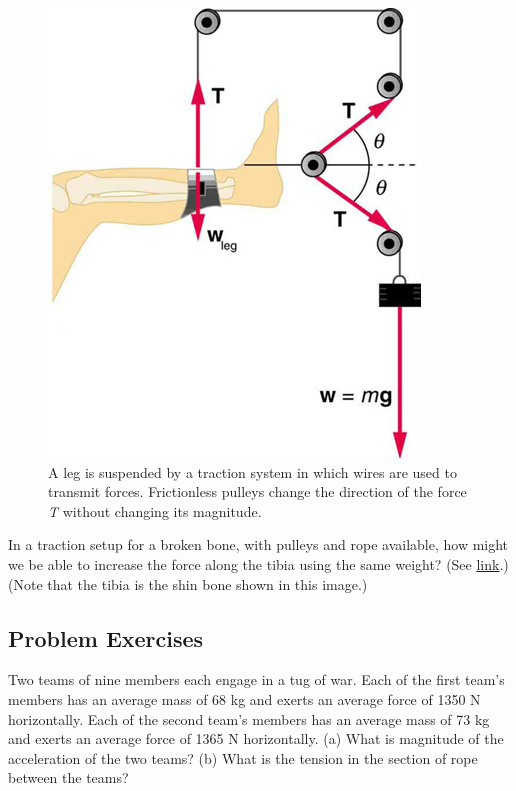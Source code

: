 \documentclass[
]{book}
\begin{document}
\begin{figure}
\hypertarget{import-auto-id1436486}{%
\centering
\includegraphics{images/Figure_04_05_10.jpg}
\caption{A leg is suspended by a traction system in which wires are used to
transmit forces. Frictionless pulleys change the direction of the force
\emph{T} without changing its
magnitude.}\label{import-auto-id1436486}
}
\end{figure}

\hypertarget{fs-id1384888}{}
\leavevmode{}%
In a traction setup for a broken bone, with pulleys and rope available,
how might we be able to increase the force along the tibia using the
same weight? (See
\protect\hyperlink{import-auto-id1436486}{link}.) (Note that the
tibia is the shin bone shown in this image.)

\hypertarget{fs-id1550370}{}
\hypertarget{problem-exercises-2}{%
\subsection{Problem Exercises}\label{problem-exercises-2}}

\hypertarget{fs-id2600233}{}
\leavevmode{}%
Two teams of nine members each engage in a tug of war. Each of the first
team's members has an average mass of 68 kg and exerts an average force
of 1350 N horizontally. Each of the second team's members has an average
mass of 73 kg and exerts an average force of 1365 N horizontally. (a)
What is magnitude of the acceleration of the two teams? (b) What is the
tension in the section of rope between the teams?
\end{document}
